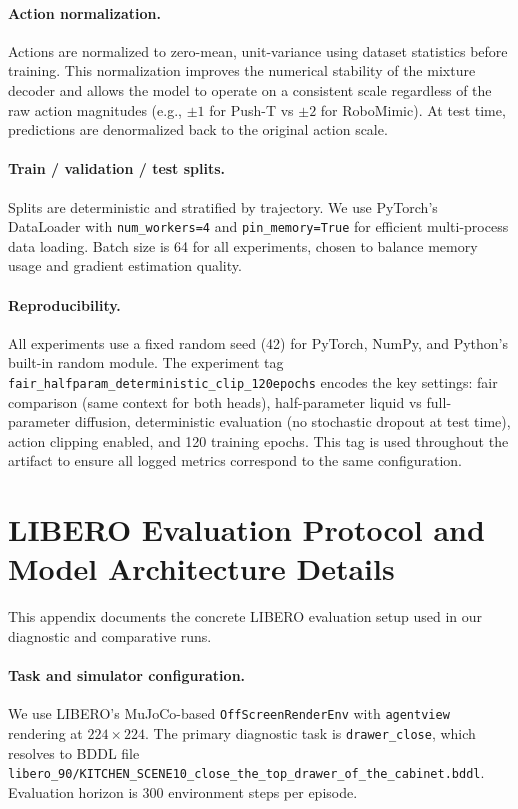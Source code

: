 \documentclass{article}
\begin{document}
\paragraph{Action normalization.}
Actions are normalized to zero-mean, unit-variance using dataset statistics before training. This normalization improves the numerical stability of the mixture decoder and allows the model to operate on a consistent scale regardless of the raw action magnitudes (e.g., $\pm 1$ for Push-T vs $\pm 2$ for RoboMimic). At test time, predictions are denormalized back to the original action scale.

\paragraph{Train / validation / test splits.}
Splits are deterministic and stratified by trajectory. We use PyTorch's DataLoader with \texttt{num\_workers=4} and \texttt{pin\_memory=True} for efficient multi-process data loading. Batch size is 64 for all experiments, chosen to balance memory usage and gradient estimation quality.

\paragraph{Reproducibility.}
All experiments use a fixed random seed (42) for PyTorch, NumPy, and Python's built-in random module. The experiment tag \texttt{fair\_halfparam\_deterministic\_clip\_120epochs} encodes the key settings: fair comparison (same context for both heads), half-parameter liquid vs full-parameter diffusion, deterministic evaluation (no stochastic dropout at test time), action clipping enabled, and 120 training epochs. This tag is used throughout the artifact to ensure all logged metrics correspond to the same configuration.

\section{LIBERO Evaluation Protocol and Model Architecture Details}\label{app:libero-protocol}

This appendix documents the concrete LIBERO evaluation setup used in our diagnostic and comparative runs.

\paragraph{Task and simulator configuration.}
We use LIBERO's MuJoCo-based \texttt{OffScreenRenderEnv} with \texttt{agentview} rendering at $224\times224$. The primary diagnostic task is \texttt{drawer\_close}, which resolves to BDDL file \texttt{libero\_90/KITCHEN\_SCENE10\_close\_the\_top\_drawer\_of\_the\_cabinet.bddl}. Evaluation horizon is 300 environment steps per episode.
\end{document}
